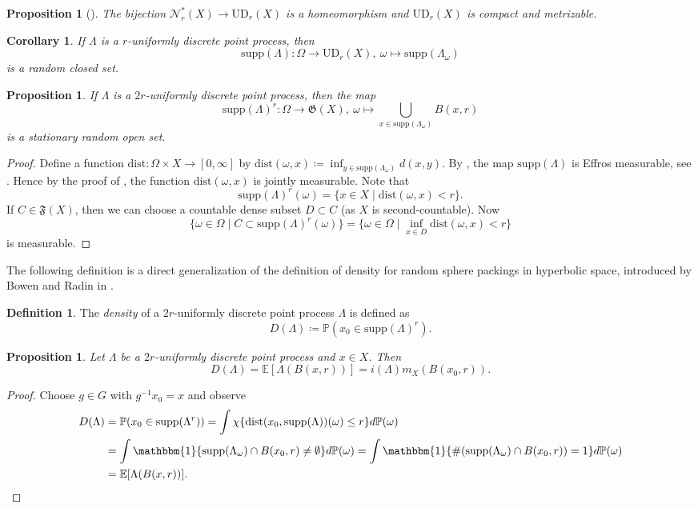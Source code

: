 \documentclass[12pt,reqno,a4paper]{amsart}
\theoremstyle{theorem}
\newtheorem{proposition}[theorem]{Proposition}
\newtheorem{corollary}[theorem]{Corollary}
\theoremstyle{definition}
\newtheorem{definition}[theorem]{Definition}
\numberwithin{theorem}{section}
\numberwithin{equation}{section}
\newcommand{\UD}{\mathrm{UD}}
\newcommand{\supp}{\mathrm{supp}}
\begin{document}
\begin{proposition}[{\cite[Proposition 3.2]{BHP2}}]
	The bijection $\mathcal{N}_r^*(X)\to \UD_r(X)$ is a homeomorphism and $\UD_r(X)$ is compact and metrizable.
\end{proposition}

\begin{corollary}
	If $\Lambda$ is a $r$-uniformly discrete point process, then 
	\[\supp(\Lambda):\Omega\to \UD_r(X),\ \omega\mapsto \supp(\Lambda_\omega)\]
	is a random closed set.
\end{corollary}
\begin{proposition}
	If $\Lambda$ is a $2r$-uniformly discrete point process, then the map
	\[\supp(\Lambda)^r:\Omega\to \mathfrak{G}(X),\ \omega\mapsto \bigcup_{x\in \supp(\Lambda_\omega)}B(x,r)\]
	is a stationary random open set.
\end{proposition}
\begin{proof}
	Define a function $\mathrm{dist}:\Omega\times X\to [0,\infty]$ by $\mathrm{dist}(\omega, x)\coloneqq \inf_{y\in \supp(\Lambda_\omega)}d(x,y)$. By \cite[Theorem 1.3.14]{Molchanov}, the map $\supp(\Lambda)$ is Effros measurable, see \cite[Definition 1.3.1]{Molchanov}. Hence by the proof of \cite[Theorem 1.3.3]{Molchanov}, the function $\mathrm{dist}(\omega, x)$ is jointly measurable.
	Note that 
	\[\supp(\Lambda)^r(\omega) = \{x\in X\mid \mathrm{dist}(\omega,x)< r\}.\]
	If $C\in \mathfrak{F}(X)$, then we can choose a countable dense subset $D\subset C$ (as $X$ is second-countable). Now 
	\[\{\omega\in \Omega\mid C\subset \supp(\Lambda)^r(\omega)\} = \{\omega\in \Omega\mid \inf_{x\in D}\mathrm{dist}(\omega,x)<r\}\]
	is measurable.
\end{proof}

The following definition is a direct generalization of the definition of density for random sphere packings in hyperbolic space, introduced by Bowen and Radin in \cite{Bowen2003}.
\begin{definition}
	The \emph{density} of a $2r$-uniformly discrete point process $\Lambda$ is defined as
	\[D(\Lambda) \coloneqq \mathbb{P}(x_0\in\supp(\Lambda)^r).\]
\end{definition}
\begin{proposition}\label{p:formula_density}
	Let $\Lambda$ be a $2r$-uniformly discrete point process and $x\in X$. Then
	\[D(\Lambda) = \mathbb{E}[\Lambda(B(x, r))] = i(\Lambda)m_X(B(x_0,r)).\]
\end{proposition}
\begin{proof}
	Choose $g\in G$ with $g^{-1}x_0=x$ and observe 
	\begin{align*}
		D(\Lambda) &= \mathbb{P}(x_0\in \supp(\Lambda^r)) = \int \chi\{\mathrm{dist}(x_0,\supp(\Lambda))(\omega)\leq r\} d\mathbb{P}(\omega)\\ 
		&= \int \mathbbm{1}\{\supp(\Lambda_\omega)\cap B(x_0,r)\neq \emptyset\}d\mathbb{P}(\omega) =  \int \mathbbm{1}\{\#(\supp(\Lambda_\omega)\cap B(x_0,r))=1\}d\mathbb{P}(\omega)\\
		&= \mathbb{E}[\Lambda(B(x, r))].\qedhere
	\end{align*}
\end{proof}
\end{document}
